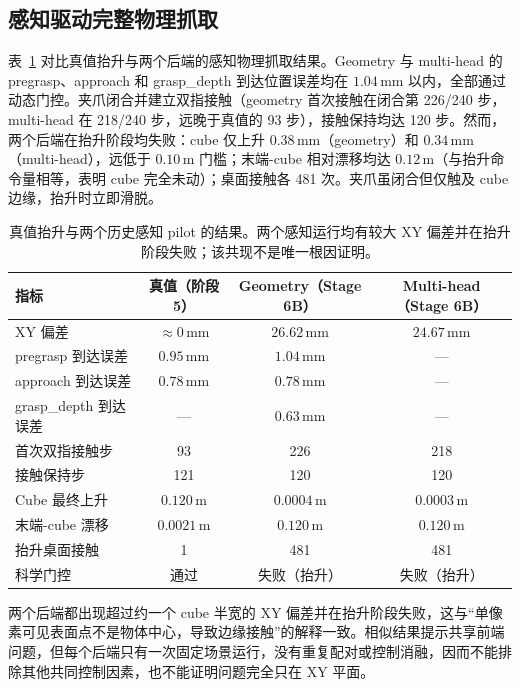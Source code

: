 \documentclass{l4proj}
\begin{document}
\subsection{感知驱动完整物理抓取}
表~\ref{tab:perception-grasp-results} 对比真值抬升与两个后端的感知物理抓取结果。Geometry 与 multi-head 的 pregrasp、approach 和 grasp\_depth 到达位置误差均在 $1.04$\,mm 以内，全部通过动态门控。夹爪闭合并建立双指接触（geometry 首次接触在闭合第 226/240 步，multi-head 在 218/240 步，远晚于真值的 93 步），接触保持均达 120 步。然而，两个后端在抬升阶段均失败：cube 仅上升 $0.38$\,mm（geometry）和 $0.34$\,mm（multi-head），远低于 $0.10$\,m 门槛；末端-cube 相对漂移均达 $0.12$\,m（与抬升命令量相等，表明 cube 完全未动）；桌面接触各 481 次。夹爪虽闭合但仅触及 cube 边缘，抬升时立即滑脱。

\begin{table}[htbp]
  \centering
  \caption{真值抬升与两个历史感知 pilot 的结果。两个感知运行均有较大 XY 偏差并在抬升阶段失败；该共现不是唯一根因证明。}
  \label{tab:perception-grasp-results}
  \begin{tabular}{lccc}
    \toprule
    指标 & 真值（阶段 5） & Geometry（Stage 6B） & Multi-head（Stage 6B） \\
    \midrule
    XY 偏差 & $\approx0$\,mm & $26.62$\,mm & $24.67$\,mm \\
    pregrasp 到达误差 & $0.95$\,mm & $1.04$\,mm & --- \\
    approach 到达误差 & $0.78$\,mm & $0.78$\,mm & --- \\
    grasp\_depth 到达误差 & --- & $0.63$\,mm & --- \\
    首次双指接触步 & 93 & 226 & 218 \\
    接触保持步 & 121 & 120 & 120 \\
    Cube 最终上升 & $0.120$\,m & $0.0004$\,m & $0.0003$\,m \\
    末端-cube 漂移 & $0.0021$\,m & $0.120$\,m & $0.120$\,m \\
    抬升桌面接触 & 1 & 481 & 481 \\
    科学门控 & 通过 & 失败（抬升） & 失败（抬升） \\
    \bottomrule
  \end{tabular}
\end{table}

两个后端都出现超过约一个 cube 半宽的 XY 偏差并在抬升阶段失败，这与“单像素可见表面点不是物体中心，导致边缘接触”的解释一致。相似结果提示共享前端问题，但每个后端只有一次固定场景运行，没有重复配对或控制消融，因而不能排除其他共同控制因素，也不能证明问题完全只在 XY 平面。
\end{document}
